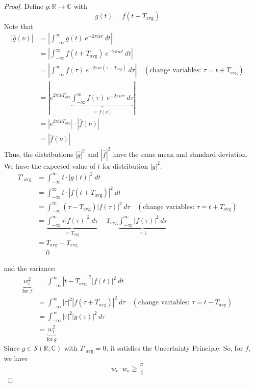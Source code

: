 \documentclass[12pt, reqno]{amsart}
\theoremstyle{definition}
\theoremstyle{remark}
\begin{document}
\begin{itemize}
\begin{proof}
    Define $g:\mathbb{R}\rightarrow \mathbb{C}$ with $$g(t)=f(t+T_\text{avg})$$
    Note that \begin{align*}
    \left|\widehat g(\nu)\right|&= \left|\int_{-\infty}^{\infty}g(t)~e^{-2\pi i \nu t}\ dt\right|\\
    &= \left|\int_{-\infty}^{\infty}f(t+T_\text{avg})~e^{-2\pi i \nu t}\ dt\right|\\
    &= \left|\int_{-\infty}^{\infty}f(\tau)~e^{-2\pi i \nu(\tau-T_{\text{avg}})}\ d \tau \right|\quad(\text{change variables: }\tau=t+T_\text{avg})\\
    &= \left|e^{2\pi i \nu T_\text{avg}}\underbrace{\int_{-\infty}^{\infty}f(\tau)~e^{-2\pi i \nu \tau}\ d \tau}_{=\widehat f(\nu )} \right|\\
    &= \left|e^{2\pi i \nu T_\text{avg}}\right|\cdot \left|\widehat f(\nu)\right|\\
    &= \left|\widehat f(\nu)\right|
    \end{align*}
    Thus, the distributions $|\widehat g|^{2}$ and $\left|\widehat f\right|^{2}$ have the same mean and standard deviation. We have the expected value of $t$ for distribution $|g|^{2}$:
    \begin{align*}
    T'_\text{avg}&= \int_{-\infty}^{\infty}t\cdot |g(t)|^{2}\ dt\\
    &= \int_{-\infty}^{\infty}t\cdot |f(t+T_\text{avg})|^{2}\ dt\\
    &= \int_{-\infty}^{\infty}(\tau-T_\text{avg})|f(\tau)|^{2}\ d \tau\quad(\text{change variables: }\tau=t+T_\text{avg})\\
    &= \underbrace{\int_{-\infty}^{\infty}\tau|f(\tau)|^{2}\ d \tau}_{=T_\text{avg}}- T_{\text{avg}}\underbrace{\int_{-\infty}^{\infty}|f(\tau)|^{2}\ d \tau}_{=1}\\
    &= T_\text{avg}-T_\text{avg}\\
    &= 0
    \end{align*}
    
    and the variance:
\begin{align*}
    \underbrace{w_{t}^{2}}_{\text{for }f}&= \int_{-\infty}^{\infty}|t-T_\text{avg}|^{2} |f(t)|^{2}\ dt\\
    &= \int_{-\infty}^{\infty}|\tau|^{2}|f(\tau+T_\text{avg})|^{2}\ d \tau\quad(\text{change variables: }\tau=t-T_\text{avg})\\
    &= \int_{-\infty}^{\infty}|\tau|^{2}|g(\tau)|^{2}\ d \tau\\
    &= \underbrace{w_{t}^{2}}_{\text{for }g}
    \end{align*}
    Since $g\in\mathcal{S}(\mathbb{R};\mathbb{C})$ with $T'_\text{avg}=0$, it satisfies the Uncertainty Principle. So, for $f$, we have $$
    w_{t}\cdot w_{\nu}\ge \frac{\pi}{4}
    $$
\end{proof}


\end{itemize}
\end{document}
